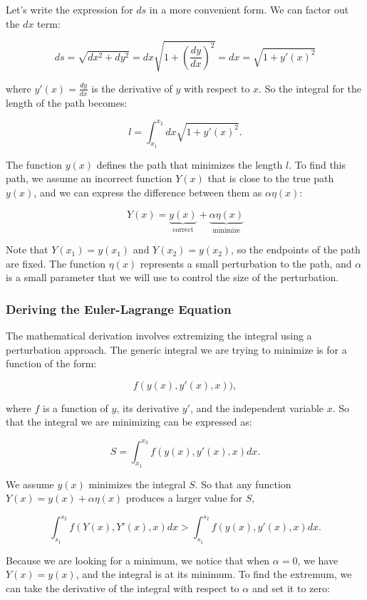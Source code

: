 \documentclass[11pt]{article}
\begin{document}
Let's write the expression for \(ds\) in a more convenient form. We can
factor out the \(dx\) term:

\[ds = \sqrt{dx^2 + dy^2} = dx \sqrt{1 + \left(\frac{dy}{dx}\right)^2} = dx = \sqrt{1 + y'(x)^2}\]

where \(y'(x) = \frac{dy}{dx}\) is the derivative of \(y\) with respect
to \(x\). So the integral for the length of the path becomes:

\[l = \int_{x_1}^{x_2} dx \sqrt{1 + y'(x)^2}.\]

The function \(y(x)\) defines the path that minimizes the length \(l\).
To find this path, we assume an incorrect function \(Y(x)\) that is
close to the true path \(y(x)\), and we can express the difference
between them as \(\alpha\eta(x)\):

\[Y(x) = \underbrace{y(x)}_{\textrm{correct}}+ \underbrace{\alpha\eta(x)}_{\textrm{minimize}}\]

Note that \(Y(x_1) = y(x_1)\) and \(Y(x_2) = y(x_2)\), so the endpoints
of the path are fixed. The function \(\eta(x)\) represents a small
perturbation to the path, and \(\alpha\) is a small parameter that we
will use to control the size of the perturbation.

    \subsubsection{Deriving the Euler-Lagrange
Equation}\label{deriving-the-euler-lagrange-equation}

The mathematical derivation involves extremizing the integral using a
perturbation approach. The generic integral we are trying to minimize is
for a function of the form:

\[f(y(x),y'(x),x)),\]

where \(f\) is a function of \(y\), its derivative \(y'\), and the
independent variable \(x\). So that the integral we are minimizing can
be expressed as:

\[S=\int_{x_1}^{x_2} f(y(x),y'(x),x) dx.\]

We assume \(y(x)\) minimizes the integral \(S\). So that any function
\(Y(x) = y(x) + \alpha\eta(x)\) produces a larger value for \(S\),

\[\int_{s_1}^{s_2} f(Y(x),Y'(x),x) dx > \int_{s_1}^{s_2} f(y(x),y'(x),x) dx.\]

Because we are looking for a minimum, we notice that when
\(\alpha = 0\), we have \(Y(x) = y(x)\), and the integral is at its
minimum. To find the extremum, we can take the derivative of the
integral with respect to \(\alpha\) and set it to zero:
\end{document}
